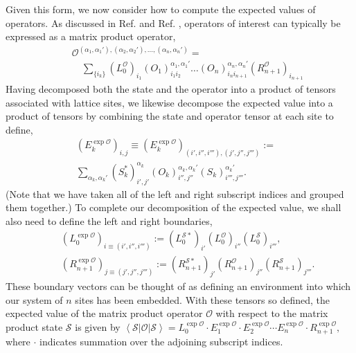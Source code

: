 \documentclass[12pt]{amsbook}
\theoremstyle{plain}
\theoremstyle{definition}
\theoremstyle{remark}
\newcommand{\coip}[3]{\left<#1\left|#2\right|#3\right>}
\newcommand{\paren}[1]{\left(#1\right)}
\begin{document}
Given this form, we now consider how to compute the expected values of operators.  As discussed in Ref. \cite{cond-mat/0701428} and Ref. \cite{caching}, operators of interest can typically be expressed as a matrix product operator, \begin{eqnarray}
&&\mathcal{O}^{(\alpha_1,\alpha_1'),(\alpha_2,\alpha_2'),\dots,(\alpha_n,\alpha_n')} = \nonumber \\
&&\quad\sum_{\{i_k\}} \paren{L_0^{\mathcal{O}}}_{i_1}\paren{O_1}^{\alpha_1,\alpha_1'}_{i_1 i_2}\dots \paren{O_n}^{\alpha_n,\alpha_n'}_{i_n i_{n+1}} \paren{R_{n+1}^{\mathcal{O}}}_{i_{n+1}} \label{matrix-product-operator}
\end{eqnarray}  Having decomposed both the state and the operator into a product of tensors associated with lattice sites, we likewise decompose the expected value into a product of tensors by combining the state and operator tensor at each site to define,  \begin{eqnarray}
\paren{E_k^{\exp{\mathcal{O}}}}_{i,j} \equiv \paren{E_k^{\exp{\mathcal{O}}}}_{(i',i'',i'''),(j',j'',j''')}:= \nonumber & \\
\sum_{\alpha_k,\alpha_k'} \paren{S_k^*}^{\alpha_k}_{i',j'}\paren{O_k}^{\alpha_k,\alpha_k'}_{i'',j''} \paren{S_k}^{\alpha_k'}_{i''',j'''}. \nonumber &
\end{eqnarray}  (Note that we have taken all of the left and right subscript indices and grouped them together.)  To complete our decomposition of the expected value, we shall also need to define the left and right boundaries, \begin{eqnarray}
&&\paren{L_0^{\exp{\mathcal{O}}}}_{i\equiv(i',i'',i''')}:= \paren{L_0^{\mathcal{S} *}}_{i'}\paren{L_0^{\mathcal{O}}}_{i''}\paren{L_0^{\mathcal{S}}}_{i'''}, \label{MPO-boundaries} \\
&&\paren{R_{n+1}^{\exp{\mathcal{O}}}}_{j\equiv(j',j'',j''')}:= \paren{R_{n+1}^{\mathcal{S}*}}_{j'}\paren{R_{n+1}^{\mathcal{O}}}_{j''}\paren{R_{n+1}^{\mathcal{S}}}_{j'''}. \nonumber
\end{eqnarray}  These boundary vectors can be thought of as defining an environment into which our system of $n$ sites
has been embedded.  With these tensors so defined, the expected value of the matrix product operator $\mathcal{O}$ with respect to the matrix product state $\mathcal{S}$ is given by $\coip{\mathcal{S}}{\mathcal{O}}{\mathcal{S}} = L_0^{\exp{\mathcal{O}}} \cdot E_1^{\exp{\mathcal{O}}} \cdot E_2^{\exp{\mathcal{O}}} \cdots E_n^{\exp{\mathcal{O}}} \cdot R_{n+1}^{\exp{\mathcal{O}}},$ where $\cdot$ indicates summation over the adjoining subscript indices.
\end{document}
